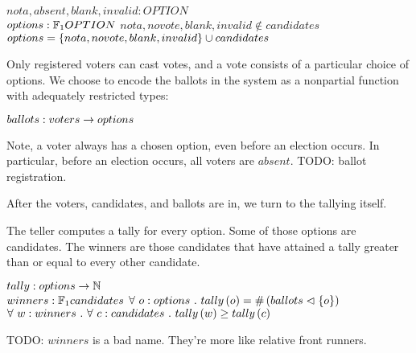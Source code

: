 \begin{axdef}
$nota, absent, blank, invalid : OPTION$ \\
$options : \finset_1 OPTION $
\where
$nota, novote, blank, invalid \notin candidates $\\
$options = \left\{{ nota, novote, blank, invalid }\right\} \cup candidates$
\end{axdef}

Only registered voters can cast votes, and a vote consists of a particular
choice of options. We choose to encode the ballots in the system as a
nonpartial function with adequately restricted types:

\begin{axdef}
$ballots : voters \rightarrow options$
\end{axdef}

Note, a voter always has a chosen option, even before an election occurs. In
particular, before an election occurs, all voters are $absent$. TODO: ballot
registration.

After the voters, candidates, and ballots are in, we turn to the tallying
itself.

The teller computes a tally for every option. Some of those options are
candidates. The winners are those candidates that have attained a tally greater
than or equal to every other candidate.

\begin{axdef}
  $tally : options \rightarrow \mathbb{N}$ \\
  $winners : \finset_1 candidates$
\where
  $\forall\ o : options\ .\ tally\left({o}\right) =
    \# \left({ ballots \vartriangleleft \left\{{ o }\right\} }\right)$ \\
  $\forall\ w : winners\ .\ \forall\ c : candidates
    \ .\ tally\left({w}\right) \geq tally\left({c}\right)$ \\
\end{axdef}

TODO: $winners$ is a bad name. They're more like relative front runners.

